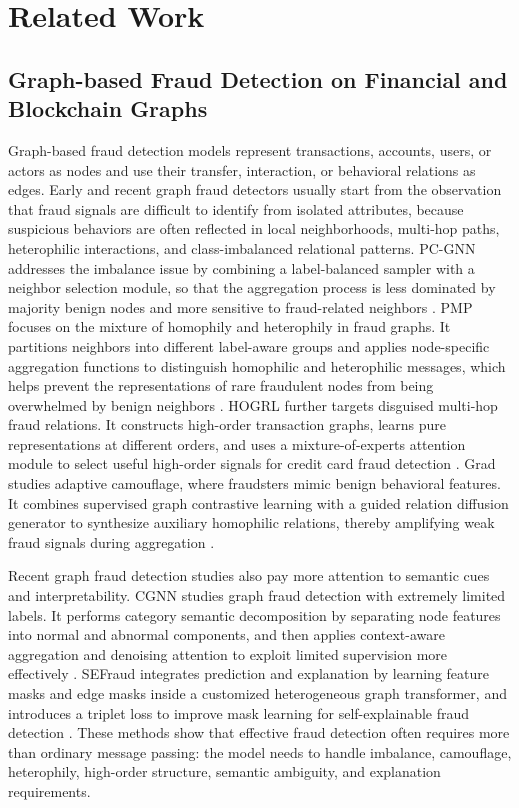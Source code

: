 \section{Related Work}
\label{sec:related-work}

\subsection{Graph-based Fraud Detection on Financial and Blockchain Graphs}
\label{subsec:rw-graph-fraud}

Graph-based fraud detection models represent transactions, accounts, users, or actors as nodes and use their transfer, interaction, or behavioral relations as edges. Early and recent graph fraud detectors usually start from the observation that fraud signals are difficult to identify from isolated attributes, because suspicious behaviors are often reflected in local neighborhoods, multi-hop paths, heterophilic interactions, and class-imbalanced relational patterns. PC-GNN addresses the imbalance issue by combining a label-balanced sampler with a neighbor selection module, so that the aggregation process is less dominated by majority benign nodes and more sensitive to fraud-related neighbors \cite{liu2021pcgnn}. PMP focuses on the mixture of homophily and heterophily in fraud graphs. It partitions neighbors into different label-aware groups and applies node-specific aggregation functions to distinguish homophilic and heterophilic messages, which helps prevent the representations of rare fraudulent nodes from being overwhelmed by benign neighbors \cite{zhuo2024pmp}. HOGRL further targets disguised multi-hop fraud relations. It constructs high-order transaction graphs, learns pure representations at different orders, and uses a mixture-of-experts attention module to select useful high-order signals for credit card fraud detection \cite{zou2024hogrl}. Grad studies adaptive camouflage, where fraudsters mimic benign behavioral features. It combines supervised graph contrastive learning with a guided relation diffusion generator to synthesize auxiliary homophilic relations, thereby amplifying weak fraud signals during aggregation \cite{yang2025grad}.

Recent graph fraud detection studies also pay more attention to semantic cues and interpretability. CGNN studies graph fraud detection with extremely limited labels. It performs category semantic decomposition by separating node features into normal and abnormal components, and then applies context-aware aggregation and denoising attention to exploit limited supervision more effectively \cite{li2025cgnn}. SEFraud integrates prediction and explanation by learning feature masks and edge masks inside a customized heterogeneous graph transformer, and introduces a triplet loss to improve mask learning for self-explainable fraud detection \cite{li2024sefraud}. These methods show that effective fraud detection often requires more than ordinary message passing: the model needs to handle imbalance, camouflage, heterophily, high-order structure, semantic ambiguity, and explanation requirements.

